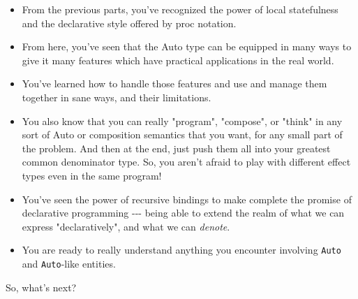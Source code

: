 \documentclass[]{article}
\begin{document}
\begin{itemize}
\item
  From the previous parts, you've recognized the power of local statefulness and
  the declarative style offered by proc notation.
\item
  From here, you've seen that the Auto type can be equipped in many ways to give
  it many features which have practical applications in the real world.
\item
  You've learned how to handle those features and use and manage them together
  in sane ways, and their limitations.
\item
  You also know that you can really "program", "compose", or "think" in any sort
  of Auto or composition semantics that you want, for any small part of the
  problem. And then at the end, just push them all into your greatest common
  denominator type. So, you aren't afraid to play with different effect types
  even in the same program!
\item
  You've seen the power of recursive bindings to make complete the promise of
  declarative programming -\/-\/- being able to extend the realm of what we can
  express "declaratively", and what we can \emph{denote}.
\item
  You are ready to really understand anything you encounter involving
  \texttt{Auto} and \texttt{Auto}-like entities.
\end{itemize}

So, what's next?
\end{document}
